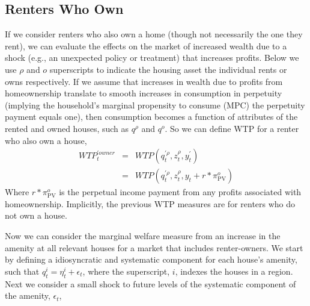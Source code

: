 \documentclass[ecta,nameyear,draft]{econsocart}
\theoremstyle{plain}
\theoremstyle{remark}
\begin{document}
\subsection{Renters Who Own}
If we consider renters who also own a home (though not necessarily the one they rent), we can evaluate the effects on the market of increased wealth due to a shock (e.g., an unexpected policy or treatment) that increases profits. Below we use $\rho$ and $o$ superscripts to indicate the housing asset the individual rents or owns respectively. If we assume that increases in wealth due to profits from homeownership translate to smooth increases in consumption in perpetuity (implying the household's marginal propensity to consume (MPC) the perpetuity payment equals one), then consumption becomes a function of attributes of the rented and owned houses, such as $q^\rho$ and $q^o$. So we can define WTP for a renter who also own a house,
\begin{eqnarray*}
	\mathit{WTP}_t^{\prime\mathit{owner}}&=&\mathit{WTP}(q_t^{\prime \rho},z_t^\rho,y_t^\prime)\\
	&=&\mathit{WTP}(q_t^{\prime \rho},z_t^\rho,y_t+r*\pi^o_{\mathrm{PV}})
\end{eqnarray*}
Where $r*\pi_{\mathrm{PV}}^o$ is the perpetual income payment from any profits associated with homeownership. Implicitly, the previous WTP measures are for renters who do not own a house.

Now we can consider the marginal welfare measure from an increase in the amenity at all relevant houses for a market that includes renter-owners. We start by defining a idiosyncratic and systematic component for each house's amenity, such that $q_{t}^i=\eta_{t}^i+\epsilon_t$, where the superscript, $i$, indexes the houses in a region. Next we consider a small shock to future levels of the systematic component of the amenity, $\epsilon_t$,%
\end{document}
